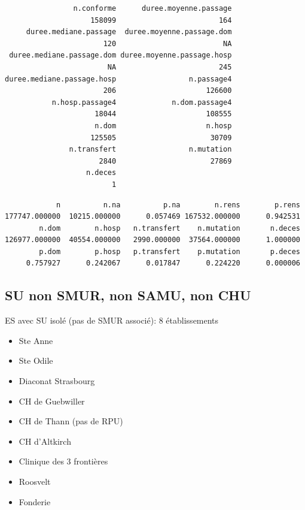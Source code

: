 \documentclass[]{article}
\begin{document}
\begin{verbatim}
                n.conforme      duree.moyenne.passage 
                    158099                        164 
     duree.mediane.passage  duree.moyenne.passage.dom 
                       120                         NA 
 duree.mediane.passage.dom duree.moyenne.passage.hosp 
                        NA                        245 
duree.mediane.passage.hosp                 n.passage4 
                       206                     126600 
           n.hosp.passage4             n.dom.passage4 
                     18044                     108555 
                     n.dom                     n.hosp 
                    125505                      30709 
               n.transfert                 n.mutation 
                      2840                      27869 
                   n.deces 
                         1 
\end{verbatim}

\begin{verbatim}
            n          n.na          p.na        n.rens        p.rens 
177747.000000  10215.000000      0.057469 167532.000000      0.942531 
        n.dom        n.hosp   n.transfert    n.mutation       n.deces 
126977.000000  40554.000000   2990.000000  37564.000000      1.000000 
        p.dom        p.hosp   p.transfert    p.mutation       p.deces 
     0.757927      0.242067      0.017847      0.224220      0.000006 
\end{verbatim}

\subsection{SU non SMUR, non SAMU, non
CHU}\label{su-non-smur-non-samu-non-chu}

ES avec SU isolé (pas de SMUR associé): 8 établissements

\begin{itemize}
\itemsep1pt\parskip0pt
\item
  Ste Anne
\item
  Ste Odile
\item
  Diaconat Strasbourg
\item
  CH de Guebwiller
\item
  CH de Thann (pas de RPU)
\item
  CH d'Altkirch
\item
  Clinique des 3 frontières
\item
  Roosvelt
\item
  Fonderie
\end{itemize}
\end{document}

